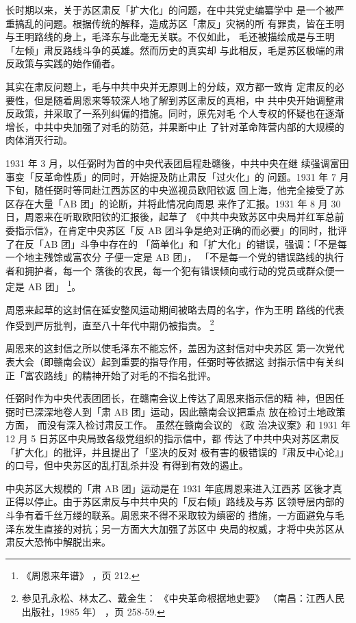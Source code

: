 长时期以来，关于苏区肃反「扩大化」的问题，在中共党史编纂学中
是一个被严重搞乱的问题。根据传统的解释，造成苏区「肃反」灾祸的所
有罪责，皆在王明与王明路线的身上，毛泽东与此毫无关联。不仅如此，
毛还被描绘成是与王明「左倾」肃反路线斗争的英雄。然而历史的真实却
与此相反，毛是苏区极端的肃反政策与实践的始作俑者。

其实在肃反问题上，毛与中共中央并无原则上的分歧，双方都一致肯
定肃反的必要性，但是随着周恩来等较深人地了解到苏区肃反的真相，中
共中央开始调整肃反政策，并采取了一系列纠偏的措施。同时，原先对毛
个人专权的怀疑也在逐渐增长，中共中央加强了对毛的防范，并果断中止
了针对革命阵营内部的大规模的肉体消灭行动。

1931 年 3 月，以任弼时为首的中央代表团启程赴赣後，中共中央在继
续强调富田事变「反革命性质」的同时，开始提及防止肃反「过火化」的
问题。1931 年 7 月下旬，随任弼时等同赴江西苏区的中央巡视员欧阳钦返
回上海，他完全接受了苏区存在大量「AB 团」的论断，并将此情况向周恩
来作了汇报。1931 年 8 月 30 日，周恩来在听取欧阳钦的汇报後，起草了
《中共中央致苏区中央局并红军总前委指示信》，在肯定中央苏区「反 AB
团斗争是绝对正确的而必要」的同时，批评了在反「AB 团」斗争中存在的
「简单化」和「扩大化」的错误，强调：「不是每一个地主残馀或富农分
子便一定是 AB 团」，
「不是每一个党的错误路线的执行者和拥护者，每一个
落後的农民，每一个犯有错误倾向或行动的党员或群众便一定是 AB 团」
\footnote{《周恩来年谱》
，页 212.}。

周恩来起草的这封信在延安整风运动期间被略去周的名字，作为王明
路线的代表作受到严厉批判，直至八十年代中期仍被指责。
\footnote{ 参见孔永松、林太乙、戴金生：
《中央革命根据地史要》
（南昌：江西人民出版社，1985 年）
，页 258-59.}

周恩来的这封信之所以使毛泽东不能忘怀，盖因为这封信对中央苏区
第一次党代表大会（即赣南会议）起到重要的指导作用，任弼时等依据这
封指示信中有关纠正「富农路线」的精神开始了对毛的不指名批评。

任弼时作为中央代表团团长，在赣南会议上传达了周恩来指示信的精
神，但因任弼时已深深地卷人到「肃 AB 团」运动，因此赣南会议把重点
放在检讨土地政策方面，
而没有深入检讨肃反工作。
虽然在赣南会议的
《政
治决议案》和 1931 年 12 月 5 日苏区中央局致各级党组织的指示信中，都
传达了中共中央对苏区肃反「扩大化」的批评，并且提出了「坚决的反对
极有害的极错误的『肃反中心论』」的口号，但中央苏区的乱打乱杀并没
有得到有效的遏止。

中央苏区大规模的「肃 AB 团」运动是在 1931 年底周恩来进入江西苏
区後才真正得以停止。由于苏区肃反与中共中央的「反右倾」路线及与苏
区领导层内部的斗争有着千丝万缕的联系。周恩来不得不采取较为缜密的
措施，一方面避免与毛泽东发生直接的对抗；另一方面大大加强了苏区中
央局的权威，才将中央苏区从肃反大恐怖中解脱出来。

